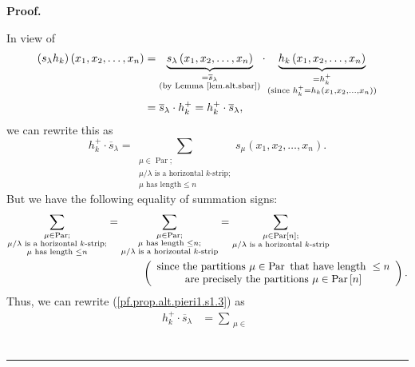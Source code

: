 \documentclass[numbers=enddot,12pt,final,onecolumn,notitlepage]{scrartcl}%
\theoremstyle{definition}
\newenvironment{proof}[1][Proof]{\noindent\textbf{#1.} }{\ \rule{0.5em}{0.5em}}
\let\sumnonlimits\sum
\renewcommand{\sum}{\sumnonlimits\limits}
\newenvironment{verlong}{}{}
\begin{document}
\begin{proof}
\begin{verlong}
\end{verlong}

\noindent In view of%
\begin{align*}
\left(  s_{\lambda}h_{k}\right)  \left(  x_{1},x_{2},\ldots,x_{n}\right)   &
=\underbrace{s_{\lambda}\left(  x_{1},x_{2},\ldots,x_{n}\right)
}_{\substack{=\overline{s}_{\lambda}\\\text{(by Lemma \ref{lem.alt.sbar})}%
}}\cdot\underbrace{h_{k}\left(  x_{1},x_{2},\ldots,x_{n}\right)
}_{\substack{=h_{k}^{+}\\\text{(since }h_{k}^{+}=h_{k}\left(  x_{1}%
,x_{2},\ldots,x_{n}\right)  \text{)}}}\\
&  =\overline{s}_{\lambda}\cdot h_{k}^{+}=h_{k}^{+}\cdot\overline{s}_{\lambda
},
\end{align*}
we can rewrite this as%
\begin{equation}
h_{k}^{+}\cdot\overline{s}_{\lambda}=\sum_{\substack{\mu\in\operatorname*{Par}%
;\\\mu/\lambda\text{ is a horizontal }k\text{-strip;}\\\mu\text{ has length
}\leq n}}s_{\mu}\left(  x_{1},x_{2},\ldots,x_{n}\right)  .
\label{pf.prop.alt.pieri1.s1.3}%
\end{equation}
But we have the following equality of summation signs:%
\begin{align*}
\sum_{\substack{\mu\in\operatorname*{Par};\\\mu/\lambda\text{ is a horizontal
}k\text{-strip;}\\\mu\text{ has length }\leq n}}  &  =\sum_{\substack{\mu
\in\operatorname*{Par};\\\mu\text{ has length }\leq n\text{;}\\\mu
/\lambda\text{ is a horizontal }k\text{-strip}}}=\sum_{\substack{\mu
\in\operatorname*{Par}\left[  n\right]  ;\\\mu/\lambda\text{ is a horizontal
}k\text{-strip}}}\\
&  \ \ \ \ \ \ \ \ \ \ \left(
\begin{array}
[c]{c}%
\text{since the partitions }\mu\in\operatorname*{Par}\text{ that have length
}\leq n\\
\text{are precisely the partitions }\mu\in\operatorname*{Par}\left[  n\right]
\end{array}
\right)  .
\end{align*}
Thus, we can rewrite (\ref{pf.prop.alt.pieri1.s1.3}) as%
\begin{align*}
h_{k}^{+}\cdot\overline{s}_{\lambda}  &  =\sum_{\substack{\mu\in
}}
\end{align*}
\end{proof}
\end{document}
